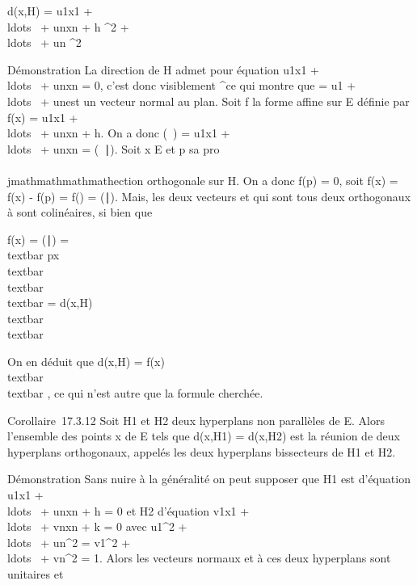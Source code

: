 d(x,H) = \textbar{}u1x1 +
\\ldots~ +
unxn + h\textbar{} \over
{} ^2  +
\\ldots~ +
un ^2

Démonstration La direction \overrightarrowH de H
admet pour équation u1x1 +
\\ldots~ +
unxn = 0, c'est donc visiblement
\overrightarrown^\bot ce qui montre que
\overrightarrown =
u1 +
\\ldots~ +
un\vecen est un vecteur normal au
plan. Soit f la forme affine sur E définie par f(x) =
u1x1 +
\\ldots~ +
unxn + h. On a donc
\vecf(\overrightarrow\xi~) =
u1x1 +
\\ldots~ +
unxn =
(\overrightarrow\xi~∣\overrightarrown).
Soit x \in E et p sa pro\\\\jmathmathmathmathection orthogonale sur H. On a donc f(p) = 0,
soit f(x) = f(x) - f(p) =\vec
f(\overrightarrowpx) =
(\overrightarrowpx∣\overrightarrown).
Mais, les deux vecteurs \overrightarrowpx et
\overrightarrown qui sont tous deux orthogonaux à
\overrightarrowH sont colinéaires, si bien que

\textbar{}f(x)\textbar{} =
\textbar{}(\overrightarrowpx∣\overrightarrown)\textbar{}
=\\textbar{}\overrightarrow
px\\textbar{}
\\textbar{}\overrightarrown\\textbar{}
=
d(x,H)\\textbar{}\overrightarrown\\textbar{}

On en déduit que d(x,H) = \textbar{}f(x)\textbar{}
\over
\\textbar{}\overrightarrown\\textbar{}
, ce qui n'est autre que la formule cherchée.

Corollaire~17.3.12 Soit H1 et H2 deux hyperplans non
parallèles de E. Alors l'ensemble des points x de E tels que
d(x,H1) = d(x,H2) est la réunion de deux hyperplans
orthogonaux, appelés les deux hyperplans bissecteurs de H1 et
H2.

Démonstration Sans nuire à la généralité on peut supposer que
H1 est d'équation u1x1 +
\\ldots~ +
unxn + h = 0 et H2 d'équation
v1x1 +
\\ldots~ +
vnxn + k = 0 avec u1^2 +
\\ldots~ +
un^2 = v1^2 +
\\ldots~ +
vn^2 = 1. Alors les vecteurs normaux
 et
 à ces deux hyperplans
sont unitaires et

